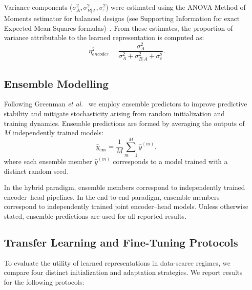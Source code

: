 Variance components ($\sigma_A^2, \sigma_{B|A}^2, \sigma_\varepsilon^2$) were estimated using the ANOVA Method of Moments estimator for balanced designs (see Supporting Information for exact Expected Mean Squares formulas)~\cite{searle1992variance}. From these estimates, the proportion of variance attributable to the learned representation is computed as:
\begin{equation}
\eta_{encoder}^2 = \frac{\sigma_A^2}{\sigma_A^2 + \sigma_{B|A}^2 + \sigma_\varepsilon^2}.
\end{equation}


\subsection{Ensemble Modelling}

Following Greenman \textit{et al.}~\cite{greenman2022multi} we employ ensemble predictors to improve predictive stability and mitigate stochasticity arising from random initialization and training dynamics. Ensemble predictions are formed by averaging the outputs of $M$ independently trained models:
\begin{equation}
\hat{y}_{\text{ens}} = \frac{1}{M} \sum_{m=1}^{M} \hat{y}^{(m)},
\end{equation}
where each ensemble member $\hat{y}^{(m)}$ corresponds to a model trained with a distinct random seed.

In the hybrid paradigm, ensemble members correspond to independently trained encoder--head pipelines. In the end-to-end paradigm, ensemble members correspond to independently trained joint encoder--head models. Unless otherwise stated, ensemble predictions are used for all reported results.


\subsection{Transfer Learning and Fine-Tuning Protocols}

To evaluate the utility of learned representations in data-scarce regimes, we compare four distinct initialization and adaptation strategies. We report results for the following protocols:

